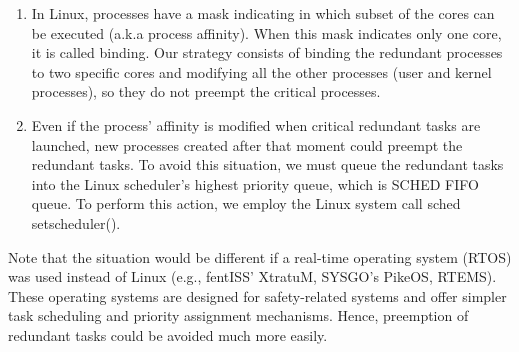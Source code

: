 \begin{enumerate}
    \item In Linux, processes have a mask indicating in which subset of the cores can be executed (a.k.a process affinity). When this mask indicates only one core, it is called binding. Our strategy consists of binding the redundant processes to two specific cores and modifying all the other processes (user and kernel processes), so they do not preempt the critical processes.

    \item Even if the process' affinity is modified when critical redundant tasks are launched, new processes created after that moment could preempt the redundant tasks. To avoid this situation, we must queue the redundant tasks into the Linux scheduler's highest priority queue, which is SCHED FIFO queue. To perform this action, we employ the Linux system call sched setscheduler().
\end{enumerate}

Note that the situation would be different if a real-time operating system (RTOS) was used instead of Linux (e.g., fentISS' XtratuM, SYSGO's PikeOS, RTEMS). These operating systems are designed for safety-related systems and offer simpler task scheduling and priority assignment mechanisms. Hence, preemption of redundant tasks could be avoided much more easily. 


\bigskip